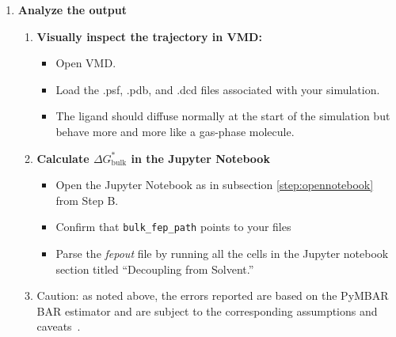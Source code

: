 \documentclass[9pt,tutorial]{Styling/livecoms}
\newcommand{\filepath}[1]{\textit{#1}}
\newcommand{\textInput}[1]{\texttt{#1}}
\begin{document}
\begin{enumerate}
        \item \textbf{Analyze the output} \label{step:analyzeBulk}
        \begin{enumerate}[label=\alph*., ref=\theenumi.\alph*]
            \item \textbf{Visually inspect the trajectory in VMD:}
            \begin{itemize}
                \item Open VMD.
                \item Load the .psf, .pdb, and .dcd files associated with your simulation.
                \item The ligand should diffuse normally at the start of the simulation but behave more and more like a gas-phase molecule.
            \end{itemize}
            \item \textbf{Calculate $\Delta G^*_\mathrm{bulk}$ in the Jupyter Notebook}
            \begin{itemize}
                \item Open the Jupyter Notebook as in subsection \ref{step:opennotebook} from Step B.
                \item Confirm that \textInput{bulk\_fep\_path} points to your files
                \item Parse the \filepath{fepout} file by running all the cells in the Jupyter notebook section titled ``Decoupling from Solvent.''
            \end{itemize}
            \item Caution: as noted above, the errors reported are based on the PyMBAR BAR estimator and are subject to the corresponding assumptions and caveats~\cite{shirts2008statistically}.
        \end{enumerate}

    \end{enumerate}
\end{document}
